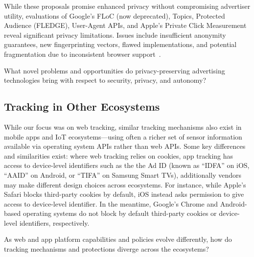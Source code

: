 While these proposals promise enhanced privacy without compromising advertiser utility, evaluations of Google's FLoC (now deprecated)\cite{rescorlaTechnicalCommentsFLoC2021,berkePrivacyLimitationsInterestbased2022,turatiLocalitySensitiveHashingDoes2023}, Topics\cite{thomsonPrivacyAnalysisGoogles2023,jhaRobustnessTopicsAPI2023,beuginInterestdisclosingMechanismsAdvertising2024,beuginPublicReproducibleAssessment2024,alvimPrivacyUtilityTradeoffTopics2024}, Protected Audience (FLEDGE)\cite{thomsonProtectedAudiencePrivacy2024,longEvaluatingGooglesProtected2024,calderonioFledgingWillContinue2024}, User-Agent APIs\cite{senolUnveilingImpactUserAgent2023,intumwayaseUARadarExploringImpact2023}, and Apple's Private Click Measurement~\cite{thomsonAnalysisApplesPrivate2022} reveal significant privacy limitations. Issues include insufficient anonymity guarantees, new fingerprinting vectors, flawed implementations, and potential fragmentation due to inconsistent browser support~\cite{munirGooglesChromeAntitrust2024}.

\begin{opbox}
What novel problems and opportunities do privacy-preserving advertising technologies bring with respect to security, privacy, and autonomy?
\end{opbox}



\subsection{Tracking in Other Ecosystems}
While our focus was on web tracking, similar tracking mechanisms also exist in mobile apps and IoT ecosystems---using often a richer set of sensor information available via operating system APIs rather than web APIs. Some key differences and similarities exist: where web tracking relies on cookies, app tracking has access to device-level identifiers such as the the Ad ID (known as ``IDFA'' on iOS, ``AAID'' on Android, or ``TIFA'' on Samsung Smart TVs), additionally vendors may make different design choices across ecosystems. For instance, while Apple's Safari blocks third-party cookies by default, iOS instead asks permission  to give access to device-level identifier. In the meantime, Google's Chrome and Android-based operating systems do not block by default third-party cookies or device-level identifiers, respectively. 

\begin{opbox}
As web and app platform capabilities and policies evolve differently, how do tracking mechanisms and protections diverge across the ecosystems? 
\end{opbox}

